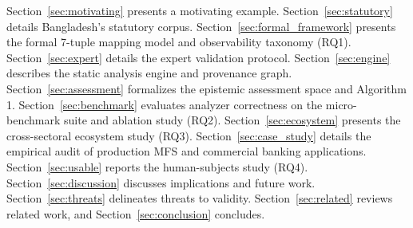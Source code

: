 Section~\ref{sec:motivating} presents a motivating example. Section~\ref{sec:statutory} details Bangladesh's statutory corpus. Section~\ref{sec:formal_framework} presents the formal 7-tuple mapping model and observability taxonomy (RQ1). Section~\ref{sec:expert} details the expert validation protocol. Section~\ref{sec:engine} describes the static analysis engine and provenance graph. Section~\ref{sec:assessment} formalizes the epistemic assessment space and Algorithm 1. Section~\ref{sec:benchmark} evaluates analyzer correctness on the micro-benchmark suite and ablation study (RQ2). Section~\ref{sec:ecosystem} presents the cross-sectoral ecosystem study (RQ3). Section~\ref{sec:case_study} details the empirical audit of production MFS and commercial banking applications. Section~\ref{sec:usable} reports the human-subjects study (RQ4). Section~\ref{sec:discussion} discusses implications and future work. Section~\ref{sec:threats} delineates threats to validity. Section~\ref{sec:related} reviews related work, and Section~\ref{sec:conclusion} concludes.
